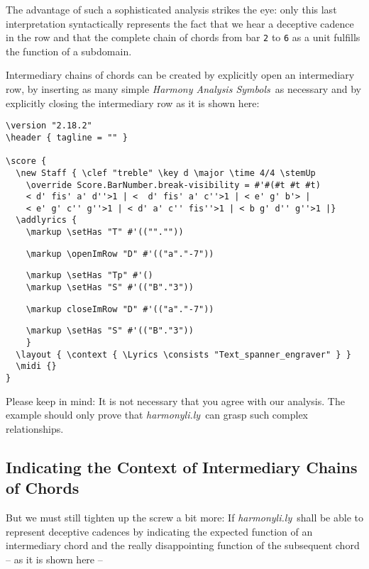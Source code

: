\documentclass[
  DIV=calc,
  BCOR=5mm,
  12pt,
  headings=small,
  oneside,
  abstract=true,
  toc=bib,
  xcolor=dvipsnames,
  openany,
  ngerman,english]{scrartcl}
\newcommand{\hlyn}[0]{\textit{harmonyli.ly}}
\newcommand{\has}[1]{\textit{Harmony Analysis Symbol#1}}
\begin{document}
The advantage of such a sophisticated analysis strikes the eye: only this last
interpretation syntactically represents the fact that we hear a deceptive
cadence in the row and that the complete chain of chords from bar \texttt{2} to
\texttt{6} as a unit fulfills the function of a subdomain.

Intermediary chains of chords can be created by explicitly open an intermediary
row, by inserting as many simple \has{s}\ as necessary and by explicitly closing
the intermediary row as it is shown here:
\begin{scriptsize}
\begin{verbatim}
\version "2.18.2"
\header { tagline = "" }

\score {
  \new Staff { \clef "treble" \key d \major \time 4/4 \stemUp 
    \override Score.BarNumber.break-visibility = #'#(#t #t #t)
    < d' fis' a' d''>1 | <  d' fis' a' c''>1 | < e' g' b'> |
    < e' g' c'' g''>1 | < d' a' c'' fis''>1 | < b g' d'' g''>1 |}
  \addlyrics { 
    \markup \setHas "T" #'((""."")) 
\end{verbatim}
{ \color{red} \verb|    \markup \openImRow "D" #'(("a"."-7"))| }
\begin{verbatim} 
    \markup \setHas "Tp" #'() 
    \markup \setHas "S" #'(("B"."3"))     
\end{verbatim}
{ \color{red} \verb|    \markup closeImRow "D" #'(("a"."-7"))| }
\begin{verbatim}  
    \markup \setHas "S" #'(("B"."3"))
    }
  \layout { \context { \Lyrics \consists "Text_spanner_engraver" } }
  \midi {}
}

\end{verbatim}
\end{scriptsize}


Please keep in mind: It is not necessary that you agree with our analysis. The
example should only prove that \hlyn\ can grasp such complex relationships.

\subsection{Indicating the Context of Intermediary Chains of Chords}

But we must still tighten up the screw a bit more: If \hlyn\ shall be able to
represent deceptive cadences by indicating the expected function of an
intermediary chord and the really disappointing function of the subsequent chord
-- as it is shown here --

\begin{center}
\end{center}
\end{document}
